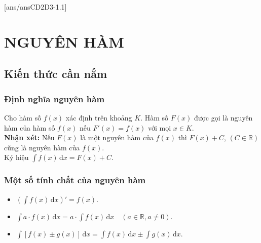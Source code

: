 [ans/ansCD2D3-1.1]
\section{NGUYÊN HÀM}
\subsection{Kiến thức cần nắm}
\subsubsection{Định nghĩa nguyên hàm}
Cho hàm số $f(x)$ xác định trên khoảng $K$. Hàm số $F(x)$ được gọi là nguyên hàm của hàm số $f(x)$ nếu $F'(x)=f(x)$ với mọi $x\in K$.\\
\textbf{Nhận xét:} Nếu $F(x)$ là một nguyên hàm của $f(x)$ thì $F(x)+C$, $(C\in\mathbb{R})$ cũng là nguyên hàm của $f(x)$.\\
Ký hiệu $\displaystyle\int f(x)\mathrm{\,d}x=F(x)+C$.\\
\subsubsection{Một số tính chất của nguyên hàm}
\begin{itemize}
	\item $\left(\displaystyle\int f(x)\mathrm{\,d}x\right)'=f(x)$.
	\item $\displaystyle\int a\cdot f(x)\mathrm{\,d}x=a\cdot\displaystyle\int f(x)\mathrm{\,d}x\quad\left(a\in\mathbb{R}, a\neq 0\right)$.
	\item $\displaystyle\int\left[f(x)\pm g(x)\right]\mathrm{\,d}x=\displaystyle\int f(x)\mathrm{\,d}x\pm\displaystyle\int g(x)\mathrm{\,d}x$.
\end{itemize}
